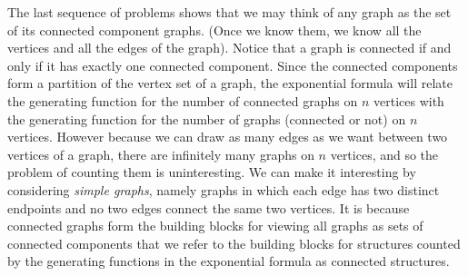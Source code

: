 \documentclass[10pt,]{book}
\theoremstyle{plain}
\theoremstyle{definition}
\numberwithin{equation}{chapter}
\begin{document}
The last sequence of problems shows that we may think of any graph as the set of its connected component graphs. (Once we know them, we know all the vertices and all the edges of the graph). Notice that a graph is connected if and only if it has exactly one connected component. Since the connected components form a partition of the vertex set of a graph, the exponential formula will relate the generating function for the number of connected graphs on \(n\) vertices with the generating function for the number of graphs (connected or not) on \(n\) vertices. However because we can draw as many edges as we want between two vertices of a graph, there are infinitely many graphs on \(n\) vertices, and so the problem of counting them is uninteresting. We can make it interesting by considering \emph{simple graphs}, namely graphs in which each edge has two distinct endpoints and no two edges connect the same two vertices. It is because connected graphs form the building blocks for viewing all graphs as sets of connected components that we refer to the building blocks for structures counted by the generating functions in the exponential formula as connected structures.%
\end{document}
